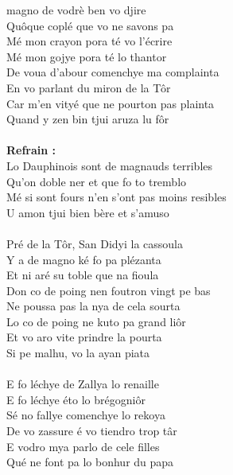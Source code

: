 
 magno de vodrè ben vo djire
\\Quôque coplé que vo ne savons pa
\\Mé mon crayon pora té vo l'écrire
\\Mé mon gojye pora té lo thantor
\\De voua d'abour comenchye ma complainta
\\En vo parlant du miron de la Tôr
\\Car m'en vityé que ne pourton pas plainta
\\Quand y zen bin tjui aruza lu fôr
\\\\\textbf{Refrain :}
\\Lo Dauphinois sont de magnauds terribles
\\Qu'on doble ner et que fo to tremblo
\\Mé si sont fours n'en s'ont pas moins resibles
\\U amon tjui bien bère et s'amuso
\\\\Pré de la Tôr, San Didyi la cassoula
\\Y a de magno ké fo pa plézanta
\\Et ni aré su toble que na fioula
\\Don co de poing nen foutron vingt pe bas
\\Ne poussa pas la nya de cela sourta
\\Lo co de poing ne kuto pa grand liôr
\\Et vo aro vite prindre la pourta
\\Si pe malhu, vo la ayan piata
\\\\E fo léchye de Zallya lo renaille
\\E fo léchye éto lo brégogniôr
\\Sé no fallye comenchye lo rekoya
\\De vo zassure é vo tiendro trop târ
\\E vodro mya parlo de cele filles
\\Qué ne font pa lo bonhur du papa

